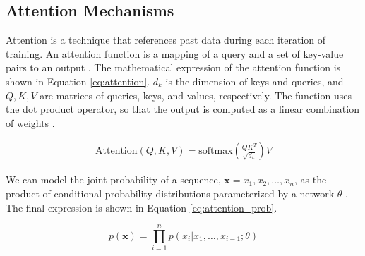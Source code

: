 \documentclass[letterpaper]{article} %
\begin{document}
\subsection{Attention Mechanisms}
Attention is a technique that references past data during each iteration of 
training.
%
%
An attention function is a mapping of a query and a
set of key-value pairs to an output \cite{attention_need}.
The mathematical expression of the attention function is shown in
Equation \ref{eq:attention}.
$d_k$ is the dimension of keys and queries, and
$Q,K,V$ are matrices of queries, keys, and values, respectively.
The function uses the dot product operator, so that the output is computed as
a linear combination of weights \cite{attention_need}.

\begin{equation}
\label{eq:attention}
\begin{split}
\text{Attention}(Q,K,V) = \text{softmax}(\frac{QK^T}{\sqrt{d_k}})V
\end{split}
\end{equation}

We can model the joint probability of a sequence,
$\mathbf{x}={x_1,x_2,\dots,x_n}$,
as the product of conditional
probability distributions parameterized by a network $\theta$
\cite{generative_transformers}.
The final expression is shown in Equation \ref{eq:attention_prob}.

\begin{equation}
\label{eq:attention_prob}
p(\mathbf{x}) = \prod_{i=1}^{n}p(x_i|x_1,\dots,x_{i-1};\theta)
\end{equation}
\end{document}
